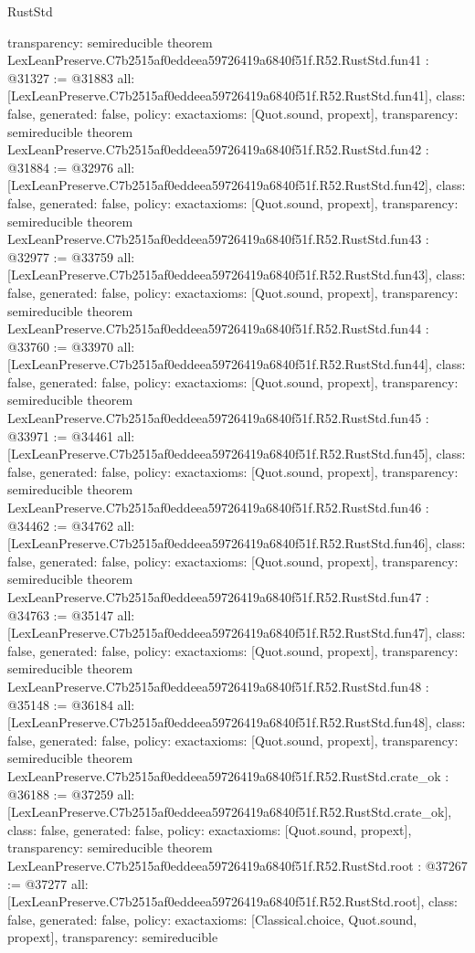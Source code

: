 \begin{lexlean}{RustStd}
\begin{coremodule}
{  transparency: semireducible
}
theorem LexLeanPreserve.C7b2515af0eddeea59726419a6840f51f.R52.RustStd.fun41 : @31327 := @31883 {
  all: [LexLeanPreserve.C7b2515af0eddeea59726419a6840f51f.R52.RustStd.fun41],
  class: false,
  generated: false,
  policy: exact{axioms: [Quot.sound, propext]},
  transparency: semireducible
}
theorem LexLeanPreserve.C7b2515af0eddeea59726419a6840f51f.R52.RustStd.fun42 : @31884 := @32976 {
  all: [LexLeanPreserve.C7b2515af0eddeea59726419a6840f51f.R52.RustStd.fun42],
  class: false,
  generated: false,
  policy: exact{axioms: [Quot.sound, propext]},
  transparency: semireducible
}
theorem LexLeanPreserve.C7b2515af0eddeea59726419a6840f51f.R52.RustStd.fun43 : @32977 := @33759 {
  all: [LexLeanPreserve.C7b2515af0eddeea59726419a6840f51f.R52.RustStd.fun43],
  class: false,
  generated: false,
  policy: exact{axioms: [Quot.sound, propext]},
  transparency: semireducible
}
theorem LexLeanPreserve.C7b2515af0eddeea59726419a6840f51f.R52.RustStd.fun44 : @33760 := @33970 {
  all: [LexLeanPreserve.C7b2515af0eddeea59726419a6840f51f.R52.RustStd.fun44],
  class: false,
  generated: false,
  policy: exact{axioms: [Quot.sound, propext]},
  transparency: semireducible
}
theorem LexLeanPreserve.C7b2515af0eddeea59726419a6840f51f.R52.RustStd.fun45 : @33971 := @34461 {
  all: [LexLeanPreserve.C7b2515af0eddeea59726419a6840f51f.R52.RustStd.fun45],
  class: false,
  generated: false,
  policy: exact{axioms: [Quot.sound, propext]},
  transparency: semireducible
}
theorem LexLeanPreserve.C7b2515af0eddeea59726419a6840f51f.R52.RustStd.fun46 : @34462 := @34762 {
  all: [LexLeanPreserve.C7b2515af0eddeea59726419a6840f51f.R52.RustStd.fun46],
  class: false,
  generated: false,
  policy: exact{axioms: [Quot.sound, propext]},
  transparency: semireducible
}
theorem LexLeanPreserve.C7b2515af0eddeea59726419a6840f51f.R52.RustStd.fun47 : @34763 := @35147 {
  all: [LexLeanPreserve.C7b2515af0eddeea59726419a6840f51f.R52.RustStd.fun47],
  class: false,
  generated: false,
  policy: exact{axioms: [Quot.sound, propext]},
  transparency: semireducible
}
theorem LexLeanPreserve.C7b2515af0eddeea59726419a6840f51f.R52.RustStd.fun48 : @35148 := @36184 {
  all: [LexLeanPreserve.C7b2515af0eddeea59726419a6840f51f.R52.RustStd.fun48],
  class: false,
  generated: false,
  policy: exact{axioms: [Quot.sound, propext]},
  transparency: semireducible
}
theorem LexLeanPreserve.C7b2515af0eddeea59726419a6840f51f.R52.RustStd.crate_ok : @36188 := @37259 {
  all: [LexLeanPreserve.C7b2515af0eddeea59726419a6840f51f.R52.RustStd.crate_ok],
  class: false,
  generated: false,
  policy: exact{axioms: [Quot.sound, propext]},
  transparency: semireducible
}
theorem LexLeanPreserve.C7b2515af0eddeea59726419a6840f51f.R52.RustStd.root : @37267 := @37277 {
  all: [LexLeanPreserve.C7b2515af0eddeea59726419a6840f51f.R52.RustStd.root],
  class: false,
  generated: false,
  policy: exact{axioms: [Classical.choice, Quot.sound, propext]},
  transparency: semireducible
}


\end{coremodule}
\end{lexlean}
